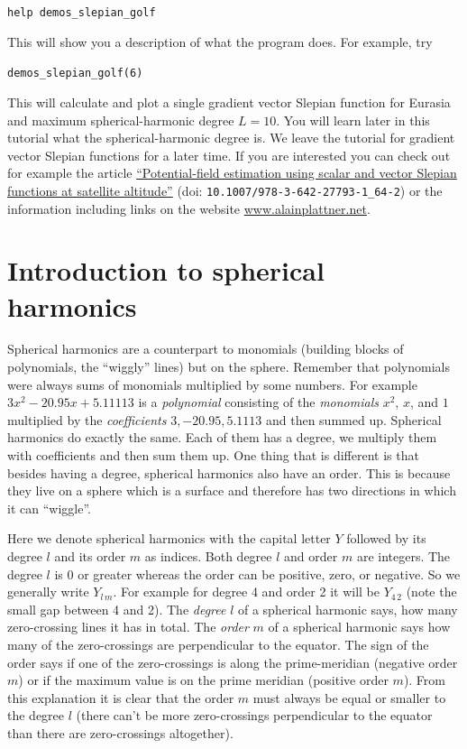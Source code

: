 \documentclass[11pt]{article}
\newcommand{\Yfun}{Y}
\begin{document}
\qquad \verb+help demos_slepian_golf+

This will show you a description of what the program does. For
example, try

\qquad \verb+demos_slepian_golf(6)+

This will calculate and plot a single gradient vector Slepian function
for Eurasia and maximum spherical-harmonic degree $L=10$. You will
learn later in this tutorial what the spherical-harmonic degree is.
We leave the tutorial for gradient vector Slepian functions for a
later time. If you are interested you can check out for example the
article
\href{https://doi.org/10.1007/978-3-642-27793-1_64-2}{``Potential-field
  estimation using scalar and vector Slepian functions at satellite
  altitude''} (doi: \verb+10.1007/978-3-642-27793-1_64-2+) or the information
including links on the website \url{www.alainplattner.net}.


\section{Introduction to spherical harmonics}

Spherical harmonics are a counterpart to monomials (building blocks of
polynomials, the ``wiggly'' lines) but on the sphere. Remember that
polynomials were always sums of monomials multiplied by some
numbers. For example $3x^2 - 20.95x + 5.11113$ is a \emph{polynomial}
consisting of the \emph{monomials} $x^2$, $x$, and $1$ multiplied by
the \emph{coefficients} $3, -20.95, 5.1113$ and then summed
up. Spherical harmonics do exactly the same. Each of them has a
degree, we multiply them with coefficients and then sum them up. One
thing that is different is that besides having a degree, spherical
harmonics also have an order. This is because they live on a sphere
which is a surface and therefore has two directions in which it can
``wiggle''.

Here we denote spherical harmonics with the capital letter $\Yfun$
followed by its degree $l$ and its order $m$ as indices. Both degree
$l$ and order $m$ are integers. The degree $l$ is 0 or greater whereas
the order can be positive, zero, or negative. So we generally write
$\Yfun_{l\,m}$. For example for degree 4 and order 2 it will be
$\Yfun_{4\,2}$ (note the small gap between 4 and 2). The \emph{degree}
$l$ of a spherical harmonic says, how many zero-crossing lines it has
in total. The \emph{order} $m$ of a spherical harmonic says how many
of the zero-crossings are perpendicular to the equator. The sign of
the order says if one of the zero-crossings is along the
prime-meridian (negative order $m$) or if the maximum value is on the
prime meridian (positive order $m$). From this explanation it is clear
that the order $m$ must always be equal or smaller to the degree $l$
(there can't be more zero-crossings perpendicular to the equator than
there are zero-crossings altogether).
\end{document}
